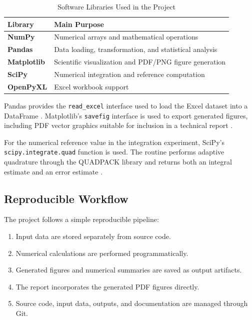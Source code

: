 \documentclass[11pt,a4paper]{article}
\begin{document}
\begin{table}[H]
\centering
\caption{Software Libraries Used in the Project}
\label{tab:libraries}

\begin{tabular}{>{\bfseries}l l}
\toprule
Library & Main Purpose \\
\midrule
NumPy & Numerical arrays and mathematical operations \\
Pandas & Data loading, transformation, and statistical analysis \\
Matplotlib & Scientific visualization and PDF/PNG figure generation \\
SciPy & Numerical integration and reference computation \\
OpenPyXL & Excel workbook support \\
\bottomrule
\end{tabular}
\end{table}

Pandas provides the \texttt{read\_excel} interface used to load the Excel
dataset into a DataFrame \cite{pandas_excel}. Matplotlib's
\texttt{savefig} interface is used to export generated figures, including
PDF vector graphics suitable for inclusion in a technical report
\cite{matplotlib_savefig}.

For the numerical reference value in the integration experiment,
SciPy's \texttt{scipy.integrate.quad} function is used. The routine
performs adaptive quadrature through the QUADPACK library and returns both
an integral estimate and an error estimate \cite{scipy_quad,piessens1983}.

\subsection{Reproducible Workflow}

The project follows a simple reproducible pipeline:

\begin{enumerate}
    \item Input data are stored separately from source code.
    \item Numerical calculations are performed programmatically.
    \item Generated figures and numerical summaries are saved as output
    artifacts.
    \item The report incorporates the generated PDF figures directly.
    \item Source code, input data, outputs, and documentation are managed
    through Git.
\end{enumerate}
\end{document}
